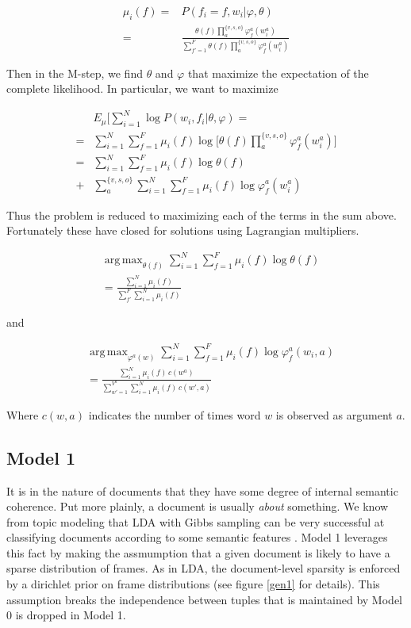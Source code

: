 \documentclass[11pt,twocolumn,DIV=11]{scrartcl}
\renewcommand\phi\varphi
\DeclareMathOperator*{\argmax}{arg\,max}
\begin{document}
\begin{align}
\mu_i(f) =& P(f_i=f, w_i|\phi,\theta)\nonumber\\
=& \frac{\theta(f)\prod_a^{\{v,s,o\}}\phi_f^a(w^a_i)}
                {\sum_{f'=1}^F\theta(f)\prod_a^{\{v,s,o\}}\phi_f^a(w^a_i)}\label{E}
\end{align}

Then in the M-step, we find $\theta$ and $\phi$ that maximize the expectation of
the complete likelihood. In particular, we want to maximize

\begin{align*}
&E_\mu\big[\sum_{i=1}^N\log P(w_i,f_i|\theta,\phi) =\\
=& \sum_{i=1}^N\sum_{f=1}^F\mu_i(f)\log\Big[\theta(f)\prod_a^{\{v,s,o\}}\phi_f^a(w_i^a)\Big]\\
=& \sum_{i=1}^N\sum_{f=1}^F\mu_i(f)\log\theta(f)\\
+& \sum_a^{\{v,s,o\}} \sum_{i=1}^N\sum_{f=1}^F\mu_i(f)\log \phi_f^a(w_i^a)
\end{align*}

Thus the problem is reduced to maximizing each of the terms in the sum above. Fortunately
these have closed for solutions using Lagrangian multipliers.


\begin{align}
&\argmax_{\theta(f)}\sum_{i=1}^N\sum_{f=1}^F\mu_i(f)\log\theta(f)\nonumber\\
&= \frac{\sum_{i=1}^N\mu_i(f)}{\sum_{f'}^F\sum_{i=1}^N\mu_i(f)}
\end{align}

and

\begin{align}
&\argmax_{\phi^a(w)}\sum_{i=1}^N\sum_{f=1}^F\mu_i(f)\log \phi_f^a(w_i,a)\nonumber\\
&= \frac{\sum_{i=1}^N \mu_i(f)\,c(w^a)}{\sum_{w'=1}^{V^a}\sum_{i=1}^N \mu_i(f)\,c(w',a)}
\end{align}

Where $c(w,a)$ indicates the number of times word $w$ is observed as argument $a$.

\subsection{Model 1}

It is in the nature of documents that they have some degree of internal semantic
coherence. Put more plainly, a document is usually \emph{about} something. We
know from topic modeling that LDA with Gibbs sampling can be very successful at
classifying documents according to some semantic features \citep{griffiths2004}.
Model 1 leverages this fact by making the assmumption that a given document is 
likely to have a sparse distribution of frames. As in LDA, the document-level
sparsity is enforced by a dirichlet prior on frame distributions (see figure
\ref{gen1} for details). This assumption breaks the independence between tuples 
that is maintained by Model 0 is dropped in Model 1.
\end{document}
